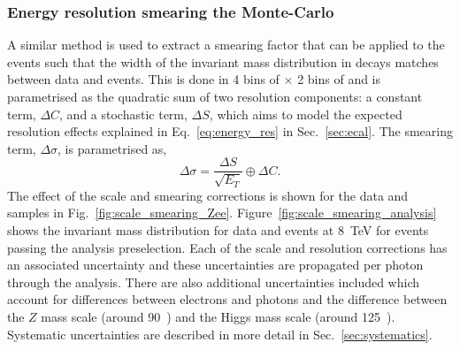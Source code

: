 \subsubsection{Energy resolution smearing the Monte-Carlo}

A similar method is used to extract a smearing factor that can be applied to the \MC events such that the width of the invariant mass distribution in \Zee decays matches between data and \MC events. This is done in 4 bins of \eta $\times$ 2 bins of \rnine and is parametrised as the quadratic sum of two resolution components: a constant term, $\Delta C$, and a stochastic term, $\Delta S$, which aims to model the expected resolution effects explained in Eq.~\ref{eq:energy_res} in Sec.~\ref{sec:ecal}. The smearing term, $\Delta\sigma$, is parametrised as,
\begin{equation}
  \Delta\sigma = \frac{\Delta S}{\sqrt{E_{T}}} \oplus \Delta C.
\end{equation}
The effect of the scale and smearing corrections is shown for the \Zee data and \MC samples in Fig.~\ref{fig:scale_smearing_Zee}. Figure~\ref{fig:scale_smearing_analysis} shows the \Zee invariant mass distribution for data and \MC events at 8~TeV for events passing the analysis preselection. Each of the scale and resolution corrections has an associated uncertainty and these uncertainties are propagated per photon through the analysis. There are also additional uncertainties included which account for differences between electrons and photons and the difference between the $Z$ mass scale (around 90~\GeV) and the Higgs mass scale (around 125~\GeV). Systematic uncertainties are described in more detail in Sec.~\ref{sec:systematics}.

